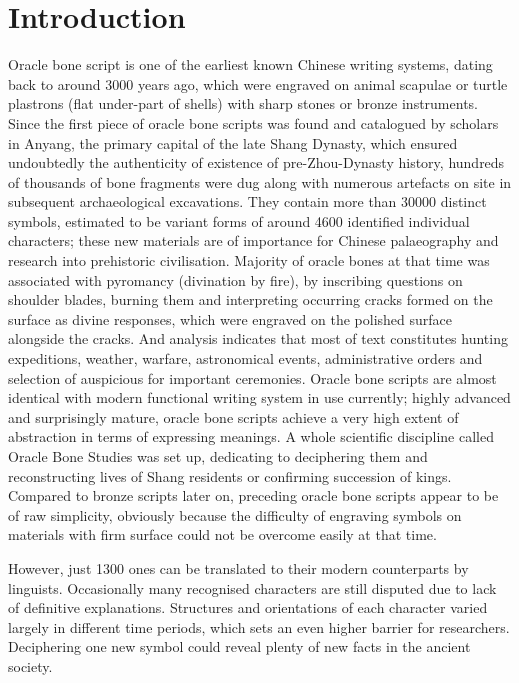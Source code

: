\chapter{Introduction}\label{ch:introduction}
Oracle bone script is one of the earliest known Chinese writing systems, dating back to around 3000 years ago, which were engraved on animal scapulae or turtle plastrons (flat under-part of shells) with sharp stones or bronze instruments. Since the first piece of oracle bone scripts was found and catalogued by scholars in Anyang, the primary capital of the late Shang Dynasty, which ensured undoubtedly the authenticity of existence of pre-Zhou-Dynasty history, hundreds of thousands of bone fragments were dug along with numerous artefacts on site in subsequent archaeological excavations. They contain more than 30000 distinct symbols, estimated to be variant forms of around 4600 identified individual characters; these new materials are of importance for Chinese palaeography and research into prehistoric civilisation. Majority of oracle bones at that time was associated with pyromancy (divination by fire), by inscribing questions on shoulder blades, burning them and interpreting occurring cracks formed on the surface as divine responses, which were engraved on the polished surface alongside the cracks. And analysis indicates that most of text constitutes hunting expeditions, weather, warfare, astronomical events, administrative orders and selection of auspicious for important ceremonies\cite[pp.~5]{de2000sources}. Oracle bone scripts are almost identical with modern functional writing system in use currently; highly advanced and surprisingly mature, oracle bone scripts achieve a very high extent of abstraction in terms of expressing meanings. A whole scientific discipline called Oracle Bone Studies was set up, dedicating to deciphering them and reconstructing lives of Shang residents or confirming succession of kings. Compared to bronze scripts later on, preceding oracle bone scripts appear to be of raw simplicity, obviously because the difficulty of engraving symbols on materials with firm surface could not be overcome easily at that time.

However, just 1300 ones can be translated to their modern counterparts by linguists. Occasionally many recognised characters are still disputed due to lack of definitive explanations. Structures and orientations of each character varied largely in different time periods, which sets an even higher barrier for researchers. Deciphering one new symbol could reveal plenty of new facts in the ancient society.

